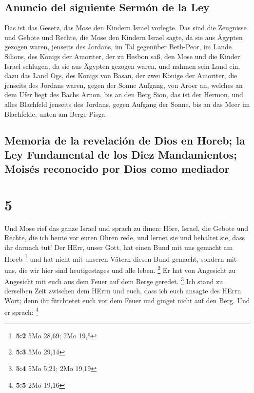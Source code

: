 \hypertarget{anuncio-del-siguiente-sermuxf3n-de-la-ley}{%
\subsection{Anuncio del siguiente Sermón de la
Ley}\label{anuncio-del-siguiente-sermuxf3n-de-la-ley}}

 Das ist das Gesetz, das Mose den Kindern Israel
vorlegte.  Das sind die Zeugnisse und Gebote und Rechte,
die Mose den Kindern Israel sagte, da sie aus Ägypten gezogen waren,
 jenseits des Jordans, im Tal gegenüber Beth-Peor, im
Lande Sihons, des Königs der Amoriter, der zu Hesbon saß, den Mose und
die Kinder Israel schlugen, da sie aus Ägypten gezogen waren,
 und nahmen sein Land ein, dazu das Land Ogs, des Königs
von Basan, der zwei Könige der Amoriter, die jenseits des Jordans waren,
gegen der Sonne Aufgang,  von Aroer an, welches an dem
Ufer liegt des Bachs Arnon, bis an den Berg Sion, das ist der Hermon,
 und alles Blachfeld jenseits des Jordans, gegen Aufgang
der Sonne, bis an das Meer im Blachfelde, unten am Berge Pisga.

\hypertarget{memoria-de-la-revelaciuxf3n-de-dios-en-horeb-la-ley-fundamental-de-los-diez-mandamientos-moisuxe9s-reconocido-por-dios-como-mediador}{%
\subsection{Memoria de la revelación de Dios en Horeb; la Ley
Fundamental de los Diez Mandamientos; Moisés reconocido por Dios como
mediador}\label{memoria-de-la-revelaciuxf3n-de-dios-en-horeb-la-ley-fundamental-de-los-diez-mandamientos-moisuxe9s-reconocido-por-dios-como-mediador}}

\hypertarget{section-4}{%
\section{5}\label{section-4}}

 Und Mose rief das ganze Israel und sprach zu ihnen: Höre,
Israel, die Gebote und Rechte, die ich heute vor euren Ohren rede, und
lernet sie und behaltet sie, dass ihr darnach tut!  Der
HErr, unser Gott, hat einen Bund mit uns gemacht am Horeb \footnote{\textbf{5:2}
  5Mo 28,69; 2Mo 19,5}  und hat nicht mit unseren Vätern
diesen Bund gemacht, sondern mit uns, die wir hier sind heutigestages
und alle leben. \footnote{\textbf{5:3} 5Mo 29,14}  Er hat
von Angesicht zu Angesicht mit euch aus dem Feuer auf dem Berge geredet.
\footnote{\textbf{5:4} 5Mo 5,21; 2Mo 19,19}  Ich stand zu
derselben Zeit zwischen dem HErrn und euch, dass ich euch ansagte des
HErrn Wort; denn ihr fürchtetet euch vor dem Feuer und ginget nicht auf
den Berg. Und er sprach: \footnote{\textbf{5:5} 2Mo 19,16}

